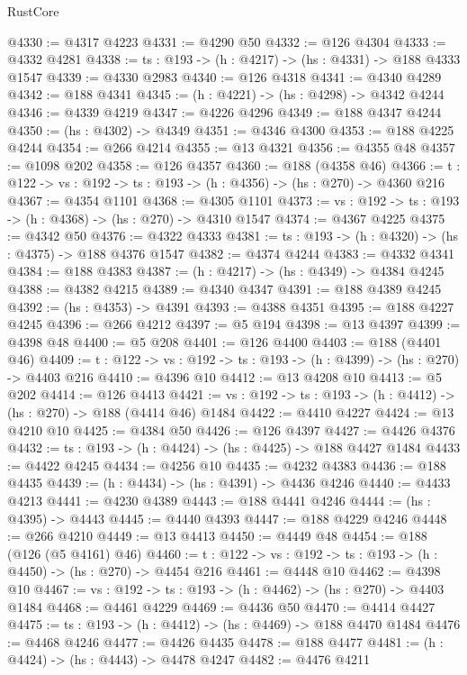 \begin{lexlean}{RustCore}
\begin{coremodule}
@4330 := @4317 @4223
@4331 := @4290 @50
@4332 := @126 @4304
@4333 := @4332 @4281
@4338 := {ts : @193} -> (h : @4217) -> (hs : @4331) -> @188 @4333 @1547
@4339 := @4330 @2983
@4340 := @126 @4318
@4341 := @4340 @4289
@4342 := @188 @4341
@4345 := (h : @4221) -> (hs : @4298) -> @4342 @4244
@4346 := @4339 @4219
@4347 := @4226 @4296
@4349 := @188 @4347 @4244
@4350 := (hs : @4302) -> @4349
@4351 := @4346 @4300
@4353 := @188 @4225 @4244
@4354 := @266 @4214
@4355 := @13 @4321
@4356 := @4355 @48
@4357 := @1098 @202
@4358 := @126 @4357
@4360 := @188 (@4358 @46)
@4366 := {t : @122} -> {vs : @192} -> {ts : @193} -> (h : @4356) -> (hs : @270) -> @4360 @216
@4367 := @4354 @1101
@4368 := @4305 @1101
@4373 := {vs : @192} -> {ts : @193} -> (h : @4368) -> (hs : @270) -> @4310 @1547
@4374 := @4367 @4225
@4375 := @4342 @50
@4376 := @4322 @4333
@4381 := {ts : @193} -> (h : @4320) -> (hs : @4375) -> @188 @4376 @1547
@4382 := @4374 @4244
@4383 := @4332 @4341
@4384 := @188 @4383
@4387 := (h : @4217) -> (hs : @4349) -> @4384 @4245
@4388 := @4382 @4215
@4389 := @4340 @4347
@4391 := @188 @4389 @4245
@4392 := (hs : @4353) -> @4391
@4393 := @4388 @4351
@4395 := @188 @4227 @4245
@4396 := @266 @4212
@4397 := @5 @194
@4398 := @13 @4397
@4399 := @4398 @48
@4400 := @5 @208
@4401 := @126 @4400
@4403 := @188 (@4401 @46)
@4409 := {t : @122} -> {vs : @192} -> {ts : @193} -> (h : @4399) -> (hs : @270) -> @4403 @216
@4410 := @4396 @10
@4412 := @13 @4208 @10
@4413 := @5 @202
@4414 := @126 @4413
@4421 := {vs : @192} -> {ts : @193} -> (h : @4412) -> (hs : @270) -> @188 (@4414 @46) @1484
@4422 := @4410 @4227
@4424 := @13 @4210 @10
@4425 := @4384 @50
@4426 := @126 @4397
@4427 := @4426 @4376
@4432 := {ts : @193} -> (h : @4424) -> (hs : @4425) -> @188 @4427 @1484
@4433 := @4422 @4245
@4434 := @4256 @10
@4435 := @4232 @4383
@4436 := @188 @4435
@4439 := (h : @4434) -> (hs : @4391) -> @4436 @4246
@4440 := @4433 @4213
@4441 := @4230 @4389
@4443 := @188 @4441 @4246
@4444 := (hs : @4395) -> @4443
@4445 := @4440 @4393
@4447 := @188 @4229 @4246
@4448 := @266 @4210
@4449 := @13 @4413
@4450 := @4449 @48
@4454 := @188 (@126 (@5 @4161) @46)
@4460 := {t : @122} -> {vs : @192} -> {ts : @193} -> (h : @4450) -> (hs : @270) -> @4454 @216
@4461 := @4448 @10
@4462 := @4398 @10
@4467 := {vs : @192} -> {ts : @193} -> (h : @4462) -> (hs : @270) -> @4403 @1484
@4468 := @4461 @4229
@4469 := @4436 @50
@4470 := @4414 @4427
@4475 := {ts : @193} -> (h : @4412) -> (hs : @4469) -> @188 @4470 @1484
@4476 := @4468 @4246
@4477 := @4426 @4435
@4478 := @188 @4477
@4481 := (h : @4424) -> (hs : @4443) -> @4478 @4247
@4482 := @4476 @4211

\end{coremodule}
\end{lexlean}
